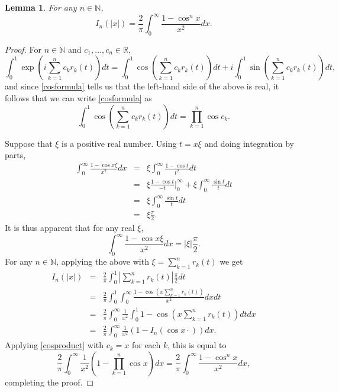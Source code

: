 \documentclass{article}
\newtheorem{lemma}[theorem]{Lemma}
\theoremstyle{definition}
\begin{document}
\begin{lemma}
For any $n \in \mathbb{N}$,
\[
I_n(|x|) = \frac{2}{\pi} \int_0^\infty \frac{1-\cos^n x}{x^2} dx.
\]
\label{absoluteformula}
\end{lemma}
\begin{proof}
For $n \in \mathbb{N}$ and $c_1,\ldots,c_n \in \mathbb{R}$,
\[
\int_0^1 \exp\left(i\sum_{k=1}^n c_k r_k(t) \right) dt = 
\int_0^1 \cos \left(\sum_{k=1}^n c_k r_k(t) \right) dt
+i\int_0^1 \sin\left(\sum_{k=1}^n c_k r_k(t) \right) dt,
\]
and since \eqref{cosformula} tells us that the left-hand side of the above is real, it follows that we can
write \eqref{cosformula} as
\begin{equation}
\int_0^1 \cos \left(\sum_{k=1}^n c_k r_k(t) \right) dt =\prod_{k=1}^n \cos c_k.
\label{cosproduct}
\end{equation}

Suppose that $\xi$ is a positive real number. Using $t=x\xi$ and doing integration by parts,
\begin{eqnarray*}
\int_0^\infty \frac{1-\cos x\xi}{x^2} dx&=&\xi\int_0^\infty \frac{1-\cos t}{t^2} dt\\
&=&\xi\frac{1-\cos t}{-t} \bigg|_0^\infty  
+\xi\int_0^\infty \frac{\sin t}{t} dt \\
&=&\xi\int_0^\infty \frac{\sin t}{t} dt\\
&=&\xi \frac{\pi}{2}.
\end{eqnarray*}
It is thus apparent that for any real $\xi$,
\[
\int_0^\infty \frac{1-\cos x\xi}{x^2} dx = |\xi| \frac{\pi}{2}.
\]
For any $n \in \mathbb{N}$, applying the above with $\xi=\sum_{k=1}^n r_k(t)$ we get
\begin{eqnarray*}
I_n(|x|)&=&\frac{2}{\pi} \int_0^1 \left| \sum_{k=1}^n r_k(t) \right|\frac{\pi}{2} dt\\
&=&\frac{2}{\pi} \int_0^1 \int_0^\infty \frac{1-\cos\left(x \sum_{k=1}^n r_k(t) \right)}{x^2} dx dt\\
&=&\frac{2}{\pi} \int_0^\infty \frac{1}{x^2} \int_0^1 1-\cos\left(x \sum_{k=1}^n r_k(t) \right) dt dx\\
&=&\frac{2}{\pi} \int_0^\infty \frac{1}{x^2} \left( 1- I_n(\cos x\cdot) \right) dx.
\end{eqnarray*}
Applying \eqref{cosproduct} with $c_k=x$ for each $k$, this is equal to
\[
\frac{2}{\pi}\int_0^\infty \frac{1}{x^2}\left(1-\prod_{k=1}^n \cos x\right) dx
=\frac{2}{\pi} \int_0^\infty \frac{1-\cos^n x}{x^2} dx,
\]
completing the proof.
\end{proof}
\end{document}
